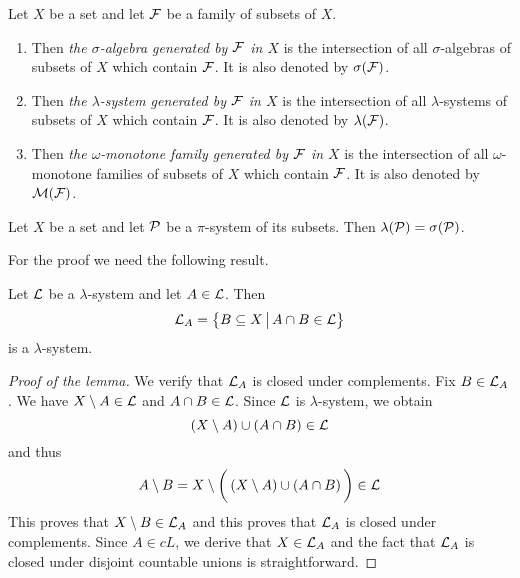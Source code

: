 \begin{definition}
    Let $X$ be a set and let ${\mathcal F}$ be a family of subsets of $X$.
    \begin{enumerate}[label=\textbf{(\arabic*)}, leftmargin=*]
        \item Then \textit{the $\sigma$-algebra generated by ${\mathcal F}$ in $X$} is the intersection of all $\sigma$-algebras of subsets of $X$ which contain ${\mathcal F}$. It is also denoted by $\sigma({\mathcal F})$.
        \item Then \textit{the $\lambda$-system generated by ${\mathcal F}$ in $X$} is the intersection of all $\lambda$-systems of subsets of $X$ which contain ${\mathcal F}$. It is also denoted by $\lambda({\mathcal F})$.
        \item Then \textit{the $\omega$-monotone family generated by ${\mathcal F}$ in $X$} is the intersection of all $\omega$-monotone families of subsets of $X$ which contain ${\mathcal F}$. It is also denoted by ${\mathcal M}({\mathcal F})$.
    \end{enumerate}
\end{definition}

\begin{theorem}\label{theorem:dynkins_lemma}
    Let $X$ be a set and let ${\mathcal P}$ be a $\pi$-system of its subsets. Then $\lambda({\mathcal P})=\sigma({\mathcal P})$.
\end{theorem}
\noindent
For the proof we need the following result.

\begin{lemma}\label{lemma:dynkins_lemmal}
    Let ${\mathcal L}$ be a $\lambda$-system and let $A \in {\mathcal L}$. Then
    $${\mathcal L}_A=\big\{B\subseteq X\,\big|\,A\cap B\in {\mathcal L} \big\}$$
    is a $\lambda$-system.
\end{lemma}
\begin{proof}[Proof of the lemma]
    We verify that ${\mathcal L}_A$ is closed under complements. Fix $B \in {\mathcal L}_A$. We have $X\setminus A \in {\mathcal L}$ and $A\cap B\in {\mathcal L}$. Since ${\mathcal L}$ is $\lambda$-system, we obtain
    $$\left(X\setminus A\right)\cup \left(A\cap B\right)\in {\mathcal L}$$
    and thus
    $$A\setminus B = X\setminus \bigg(\left(X\setminus A\right)\cup \left(A\cap B\right)\bigg) \in {\mathcal L}$$
    This proves that $X\setminus B \in {\mathcal L}_A$ and this proves that ${\mathcal L}_A$ is closed under complements. Since $A\in cL$, we derive that $X\in {\mathcal L}_A$ and the fact that ${\mathcal L}_A$ is closed under disjoint countable unions is straightforward.
\end{proof}


